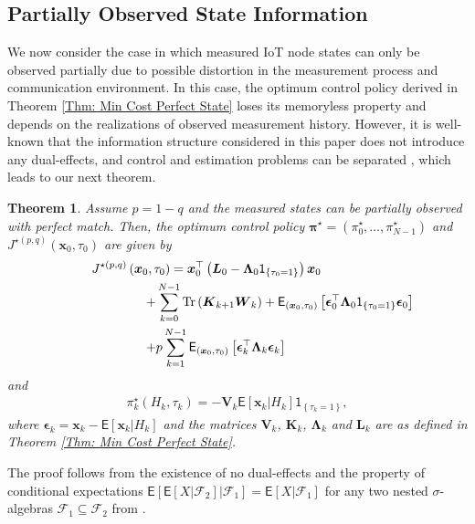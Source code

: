 \documentclass[10pt, journal, letterpaper]{IEEEtran}
\newcommand{\paren}[1]{\left(#1\right)}
\newcommand{\1}{\ensuremath{\mathbf{1}}} %
\newcommand{\I}[1]{\ensuremath{\mathsf{1}_{\left\{#1\right\}}}} %
\newcommand{\ES}[1]{\ensuremath{\mathsf{E}\left[#1 \right]}} %
\newcommand{\ESI}[2]{\ensuremath{\mathsf{E}_{#2}\left[#1 \right]}}
\newcommand{\mincost}[2]{\ensuremath{J^{\star\paren{#1, #2}}}\paren{\vec{x}_0, \tau_0}}
\renewcommand{\vec}[1]{\ensuremath{\boldsymbol{#1}}} %
\newcommand{\tr}[1]{\ensuremath{{\rm Tr}\left(#1\right)}}
\newtheorem{theorem}{Theorem}
\begin{document}
\subsection{Partially Observed State Information}
We now consider the case in which measured IoT node states can only be observed partially due to possible distortion in the measurement process and  communication environment. In this case, the optimum control policy derived in Theorem \ref{Thm: Min Cost Perfect State} loses its memoryless property and depends on the realizations of observed measurement history.  However, it is well-known that the information structure considered in this paper does not introduce any dual-effects, and control and estimation problems can be separated \cite{Bertsekas95, Tse74}, which leads to our next theorem.
\begin{theorem} \label{Thm: Min Cost Partial State}
Assume $p = 1-q$ and the measured states can be {\em partially} observed with {\em perfect} match.  Then, the optimum control policy $\vec{\pi}^\star = \paren{\pi_0^\star, \ldots, \pi_{N-1}^\star}$ and $\mincost{p}{q}$ are given by
\begin{eqnarray}
\lefteqn{\mincost{p}{q} = \vec{x}_0^\top \paren{\vec{L}_0 - \vec{\Lambda}_0 \I{\tau_0 = 1}} \vec{x}_0} \hspace{8.0cm} \nonumber \\ \lefteqn{+\sum_{k=0}^{N-1} \tr{\vec{K}_{k+1} \vec{W}_k} + \ESI{\vec{\epsilon}_0^\top \vec{\Lambda}_0 \I{\tau_0 = 1} \vec{\epsilon}_0}{\paren{\vec{x}_0, \tau_0}} } \hspace{6.5cm} \nonumber \\
\lefteqn{+ p \sum_{k=1}^{N-1} \ESI{\vec{\epsilon}_{k}^\top \vec{\Lambda}_{k} \vec{\epsilon}_{k}}{\paren{\vec{x}_0, \tau_0}}} \label{Eqn: OptCost2} \hspace{6.5cm}
\end{eqnarray}
and
\begin{eqnarray}
\pi_k^\star\paren{H_k, \tau_k} = -\vec{V}_k \ES{\vec{x}_k \big| H_k} \I{\tau_k = 1}, \label{Eqn: Optimum Control2}
\end{eqnarray}
where $\vec{\epsilon}_k = \vec{x}_k - \ES{\vec{x}_k \big| H_k}$ and the matrices $\vec{V}_k$, $\vec{K}_k$, $\vec{\Lambda}_k$ and $\vec{L}_k$ are as defined in Theorem \ref{Thm: Min Cost Perfect State}.
\end{theorem}
\begin{IEEEproof}
The proof follows from the existence of no dual-effects and the property of conditional expectations $\ES{\ES{X \big| \mathcal{F}_2} \big| \mathcal{F}_1} = \ES{X \big| \mathcal{F}_1}$ for any two nested $\sigma$-algebras $\mathcal{F}_1 \subseteq \mathcal{F}_2$ from \cite{Durrett96}.
\end{IEEEproof}
\end{document}
